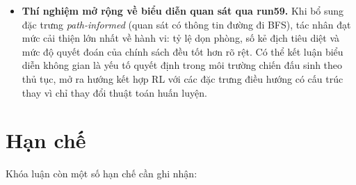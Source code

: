 \begin{itemize}
    \item \textbf{Thí nghiệm mở rộng về biểu diễn quan sát qua run59.} Khi bổ sung đặc trưng \emph{path-informed} (quan sát có thông tin đường đi BFS), tác nhân đạt mức cải thiện lớn nhất về hành vi: tỷ lệ dọn phòng, số kẻ địch tiêu diệt và mức độ quyết đoán của chính sách đều tốt hơn rõ rệt. Có thể kết luận biểu diễn không gian là yếu tố quyết định trong môi trường chiến đấu sinh theo thủ tục, mở ra hướng kết hợp RL với các đặc trưng điều hướng có cấu trúc thay vì chỉ thay đổi thuật toán huấn luyện.
\end{itemize}

\section{Hạn chế}

Khóa luận còn một số hạn chế cần ghi nhận:

